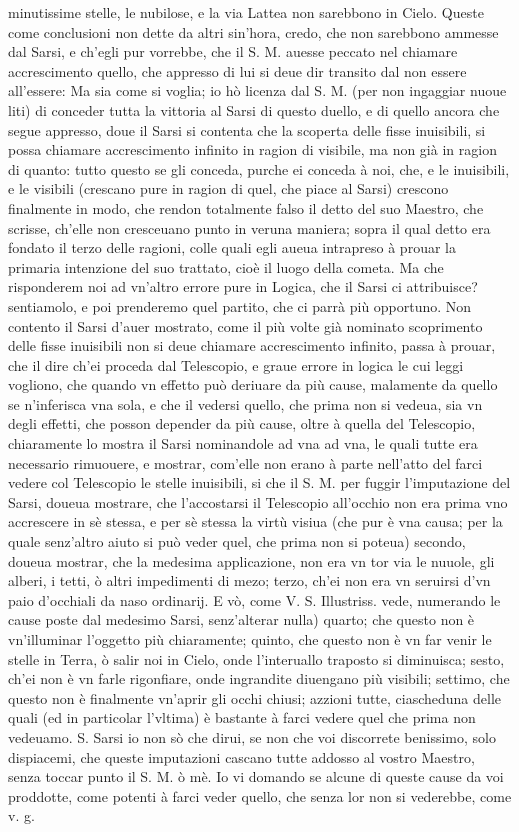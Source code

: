 \documentclass[11pt,twoside,openany]{book}
\begin{document}
minutissime stelle, le nubilose, e la via Lattea non sarebbono in Cielo. Queste come conclusioni non dette da altri sin'hora, credo, che non sarebbono ammesse dal Sarsi, e ch'egli pur vorrebbe, che il S. M. auesse peccato nel chiamare accrescimento quello, che appresso di lui si deue dir transito dal non essere all'essere: Ma sia come si voglia; io hò licenza dal S. M. (per non ingaggiar nuoue liti) di conceder tutta la vittoria al Sarsi di questo duello, e di quello ancora che segue appresso, doue il Sarsi si contenta che la scoperta delle fisse inuisibili, si possa chiamare accrescimento infinito in ragion di visibile, ma non già in ragion di quanto: tutto questo se gli conceda, purche ei conceda à noi, che, e le inuisibili, e le visibili (crescano pure in ragion di quel, che piace al Sarsi) crescono finalmente in modo, che rendon totalmente falso il detto del suo Maestro, che scrisse, ch'elle non cresceuano punto in veruna maniera; sopra il qual detto era fondato il terzo delle ragioni, colle quali egli aueua intrapreso à prouar la primaria intenzione del suo trattato, cioè il luogo della cometa. Ma che risponderem noi ad vn'altro errore pure in Logica, che il Sarsi ci attribuisce? sentiamolo, e poi prenderemo quel partito, che ci parrà più opportuno. Non contento il Sarsi d'auer mostrato, come il più volte già nominato scoprimento delle fisse inuisibili non si deue chiamare accrescimento infinito, passa à prouar, che il dire ch'ei proceda dal Telescopio, e graue errore in logica le cui leggi vogliono, che quando vn effetto può deriuare da più cause, malamente da quello se n'inferisca vna sola, e che il vedersi quello, che prima non si vedeua, sia vn degli effetti, che posson depender da più cause, oltre à quella del Telescopio, chiaramente lo mostra il Sarsi nominandole ad vna ad vna, le quali tutte era necessario rimuouere, e mostrar, com'elle non erano à parte nell'atto del farci vedere col Telescopio le stelle inuisibili, si che il S. M. per fuggir l'imputazione del Sarsi, doueua mostrare, che l'accostarsi il Telescopio all'occhio non era prima vno accrescere in sè stessa, e per sè stessa la virtù visiua (che pur è vna causa; per la quale senz'altro aiuto si può veder quel, che prima non si poteua) secondo, doueua mostrar, che la medesima applicazione, non era vn tor via le nuuole, gli alberi, i tetti, ò altri impedimenti di mezo; terzo, ch'ei non era vn seruirsi d'vn paio d'occhiali da naso ordinarij. E vò, come V. S. Illustriss. vede, numerando le cause poste dal medesimo Sarsi, senz'alterar nulla) quarto; che questo non è vn'illuminar l'oggetto più chiaramente; quinto, che questo non è vn far venir le stelle in Terra, ò salir noi in Cielo, onde l'interuallo traposto si diminuisca; sesto, ch'ei non è vn farle rigonfiare, onde ingrandite diuengano più visibili; settimo, che questo non è finalmente vn'aprir gli occhi chiusi; azzioni tutte, ciascheduna delle quali (ed in particolar l'vltima) è bastante à farci vedere quel che prima non vedeuamo. S. Sarsi io non sò che dirui, se non che voi discorrete benissimo, solo dispiacemi, che queste imputazioni cascano tutte addosso al vostro Maestro, senza toccar punto il S. M. ò mè. Io vi domando se alcune di queste cause da voi proddotte, come potenti à farci veder quello, che senza lor non si vederebbe, come v. g. 
\end{document}
